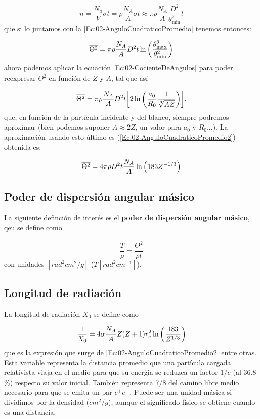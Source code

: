 \begin{equation}
    n = \frac{N_a}{V} \sigma t = \rho \frac{N_A}{A} \sigma t \approx \pi \rho \frac{N_A}{A} \frac{D^2}{\theta^2_{\min}} t 
\end{equation}
que si lo juntamos con la \cref{Ec:02-AnguloCuadraticoPromedio} tenemos entonces:

\begin{equation}
    \overline{\Theta^2} = \pi \rho \frac{N_A}{A} D^2 t \ln \pqty{\frac{\theta_{\max}^2}{\theta_{\min}^2}} 
\end{equation}
ahora podemos aplicar la ecuación \cref{Ec:02-CocienteDeAngulos} para poder reexpresar $\overline{\Theta^2}$ en función de $Z$ y $A$, tal que así 

\begin{equation}
    \overline{\Theta^2} = \pi \rho \frac{N_A}{A} D^2 t \bqty{2 \ln \pqty{\frac{a_0}{R_0} \frac{1}{\sqrt[3]{AZ}}}}. 
\end{equation}
que, en función de la partícula incidente y del blanco, siempre podremos aproximar (bien podemos suponer $A \approx 2 Z$, un valor para $a_0$ y $R_0$...). La aproximación usando esto último es (\cref{Ec:02-AnguloCuadraticoPromedio2}) obtenida es: 

\begin{equation}
    \overline{\Theta^2} = 4 \pi \rho D^2 t \frac{N_A}{A} \ln \pqty{183 Z^{-1/3}}
\end{equation}


\subsection{Poder de dispersión angular másico}

La siguiente definción de interés es el \textbf{poder de dispersión angular másico}, qeu se define como

\begin{equation}
    \frac{T}{\rho} = \frac{\overline{\Theta^2}}{\rho t}
\end{equation}
con unidades $[\unit{rad^2 cm^2 /g}]$ ($T [\unit{rad^2 cm^{-1}}]$). 


\subsection{Longitud de radiación}

La longitud de radiación $X_0$ se define como 

\begin{equation}
    \frac{1}{X_0} = 4 \alpha \frac{N_A}{A} Z (Z +1) r_e^2 \ln \pqty{\frac{183}{Z^{1/3}}}
\end{equation}
que es la expresión que surge de \cref{Ec:02-AnguloCuadraticoPromedio2} entre otras. Esta variable representa la distancia promedio que una partícula cargada relativista viaja en el medio para que su enerǵia se reduzca un factor $1/e$ (al 36.8 \%) respecto su valor inicial. También representa 7/8 del camino libre medio necesario para que se emita un par $e^+e^-$. Puede ser una unidad másica si dividimos por la densidad ($\unit{cm^2}/g$), aunque el significado físico se obtiene cuando es una distancia. 


